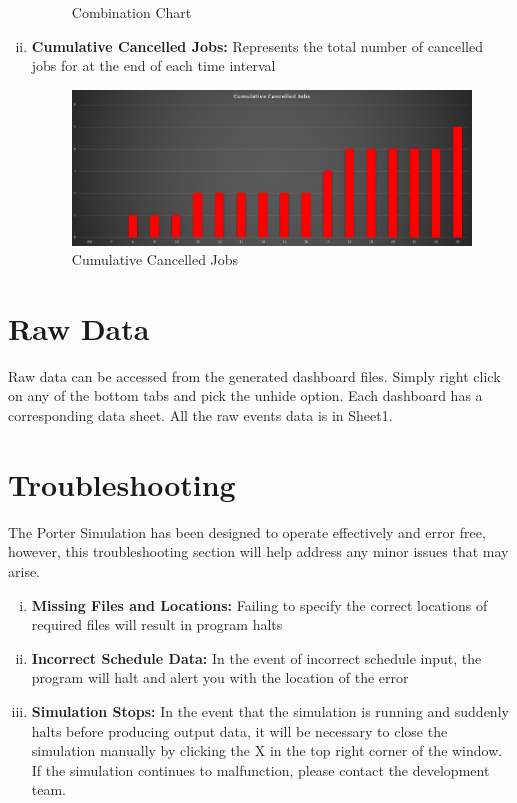 \documentclass[paper=letter, fontsize=10pt]{scrartcl}
\numberwithin{equation}{section}		%
\numberwithin{figure}{section}			%
\numberwithin{table}{section}				%
\begin{document}
\begin{enumerate}[(i)]
\begin{figure}[!htbp]
\begin{center}
			\caption{Combination Chart}
		\end{center}
		\end{figure}
		\item \textbf{Cumulative Cancelled Jobs:} Represents the total number of cancelled jobs for at the end of each time interval
		\begin{figure}[!htbp]		
		\begin{center}
			\includegraphics[width=1\columnwidth, height=0.5\textheight, keepaspectratio]{cancelledJobs.png}
			\caption{Cumulative Cancelled Jobs}
		\end{center}
		\end{figure}
	\end{enumerate}
	
\section{Raw Data}
Raw data can be accessed from the generated dashboard files. Simply right click on any of the bottom tabs and pick the unhide option. Each dashboard has a corresponding data sheet. All the raw events data is in Sheet1. 

\section{Troubleshooting}
The Porter Simulation has been designed to operate effectively and error free, however, this troubleshooting section will help address any minor issues that may arise.

\begin{enumerate}[(i)]
	\item \textbf{Missing Files and Locations:} Failing to specify the correct locations of required files will result in program halts
	\item \textbf{Incorrect Schedule Data:} In the event of incorrect schedule input, the program will halt and alert you with the location of the error
	\item \textbf{Simulation Stops:} In the event that the simulation is running and suddenly halts before producing output data, it will be necessary to close the simulation manually by clicking the X in the top right corner of the window. If the simulation continues to malfunction, please contact the development team.
\end{enumerate}
\end{document}
